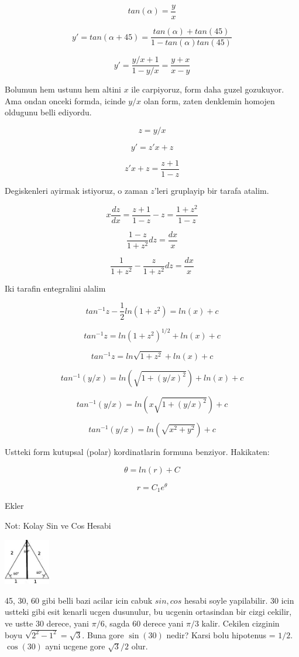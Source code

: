 \documentclass[12pt,fleqn]{article}\usepackage{../common}
\begin{document}
\[ tan (\alpha) = \frac{y}{x} \]

\[ y' = tan(\alpha + 45) = \frac{tan(\alpha) + tan(45)}{1 - tan(\alpha)tan(45)} \]

\[ y' = \frac{y/x + 1}{1-y/x} =  \frac{y+x}{x-y} \]

Bolumun hem ustunu hem altini $x$ ile carpiyoruz, form daha guzel
gozukuyor. Ama ondan onceki formda, icinde $y/x$ olan form, zaten
denklemin homojen oldugunu belli ediyordu. 

\[ z = y/x \]

\[ y' = z'x + z \]

\[ z'x +z = \frac{z+1}{1-z} \]

Degiskenleri ayirmak istiyoruz, o zaman $z$'leri gruplayip bir tarafa
atalim. 

\[ x \frac{dz}{dx} = \frac{z+1}{1-z} - z = \frac{1+z^2}{1-z} \]

\[ \frac{1-z}{1+z^2}dz = \frac{dx}{x} \]

\[ \frac{1}{1+z^2} - \frac{z}{1+z^2} dz = \frac{dx}{x} \]


Iki tarafin entegralini alalim

\[ tan^{-1}z - \frac{1}{2} ln (1+z^2) = ln(x) + c \]

\[ tan^{-1}z = ln (1+z^2)^{1/2} + ln(x) + c \]

\[ tan^{-1}z = ln \sqrt{1+z^2} + ln(x) + c \]

\[ tan^{-1}(y/x) = ln (\sqrt{1+(y/x)^2}) + ln(x) + c \]

\[ tan^{-1}(y/x) = ln(x \sqrt{1+(y/x)^2}) + c \]

\[ tan^{-1}(y/x) = ln(\sqrt{x^2+y^2}) + c \]

Ustteki form kutupsal (polar) kordinatlarin formuna benziyor. Hakikaten:

\[ \theta = ln(r) + C \]

\[ r = C_1e^{\theta} \]

Ekler

Not: Kolay Sin ve Cos Hesabi

\includegraphics[height=2cm]{4_3.png}

45, 30, 60 gibi belli bazi acilar icin cabuk $sin,cos$ hesabi soyle
yapilabilir. 30 icin ustteki gibi esit kenarli ucgen dusunulur, bu ucgenin
ortasindan bir cizgi cekilir, ve ustte 30 derece, yani $\pi/6$, sagda 60
derece yani $\pi/3$ kalir. Cekilen cizginin boyu $\sqrt{2^2 - 1^2} =
\sqrt{3}$. Buna gore $\sin(30)$ nedir? Karsi bolu hipotenus =
$1/2$. $\cos(30)$ ayni ucgene gore $\sqrt{3}/2$ olur.
\end{document}
